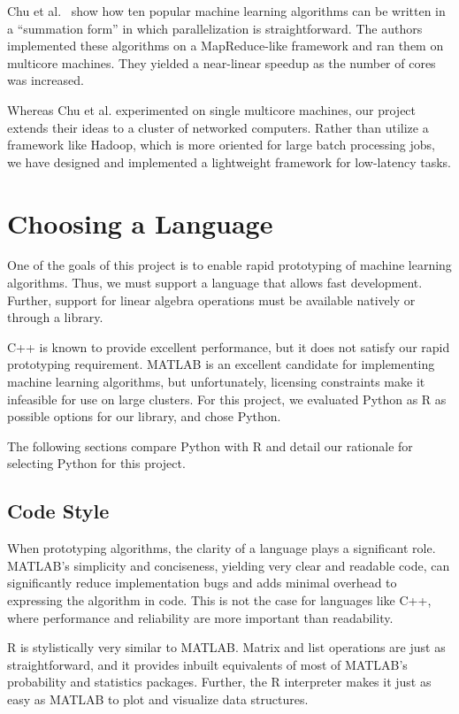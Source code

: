 \documentclass[%
  final,
  notitlepage,
  narroweqnarray,
  inline,
]{ieee}
\begin{document}
Chu et al.~\cite{chu2007map} show how ten popular machine learning algorithms
can be written in a ``summation form'' in which parallelization is
straightforward. The authors implemented these algorithms on a MapReduce-like
framework and ran them on multicore machines. They yielded a near-linear
speedup as the number of cores was increased.

Whereas Chu et al. experimented on single multicore machines, our project
extends their ideas to a cluster of networked computers. Rather than utilize a
framework like Hadoop, which is more oriented for large batch processing jobs,
we have designed and implemented a lightweight framework for low-latency tasks.

\section{Choosing a Language}

One of the goals of this project is to enable rapid prototyping of machine
learning algorithms. Thus, we must support a language that allows fast
development. Further, support for linear algebra operations must be available
natively or through a library.

C++ is known to provide excellent performance, but it does not satisfy our
rapid prototyping requirement. MATLAB is an excellent candidate for
implementing machine learning algorithms, but unfortunately, licensing
constraints make it infeasible for use on large clusters. For this project, we
evaluated Python as R as possible options for our library, and chose
Python.

The following sections compare Python with R and detail our rationale for
selecting Python for this project.

\subsection{Code Style}

When prototyping algorithms, the clarity of a language plays a significant
role. MATLAB's simplicity and conciseness, yielding very clear and readable
code, can significantly reduce implementation bugs and adds minimal overhead to
expressing the algorithm in code. This is not the case for languages like C++,
where performance and reliability are more important than readability.

R is stylistically very similar to MATLAB. Matrix and list operations are just
as straightforward, and it provides inbuilt equivalents of most of MATLAB's
probability and statistics packages. Further, the R interpreter makes it just
as easy as MATLAB to plot and visualize data structures.
\end{document}
